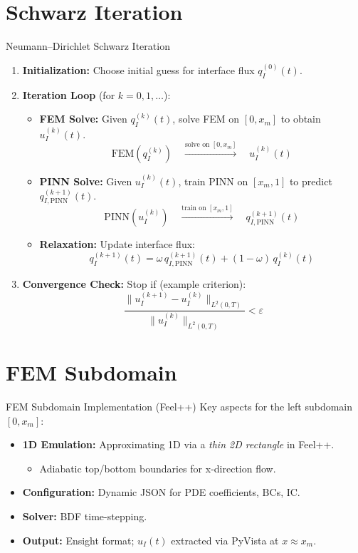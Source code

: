 \documentclass{beamer}
\begin{document}
\section{Schwarz Iteration}
\begin{frame}{Neumann–Dirichlet Schwarz Iteration}
  \begin{enumerate}
    \item \textbf{Initialization:} Choose initial guess for interface flux \(q_I^{(0)}(t)\). 
    \item \textbf{Iteration Loop} (for \(k=0,1,\dots\)):
      \begin{itemize}
        \item[(a)] \textbf{FEM Solve:} Given \(q_I^{(k)}(t)\), solve FEM on \([0,x_m]\) to obtain \(u_I^{(k)}(t)\). 
        \[ \text{FEM}(q_I^{(k)}) \quad \xrightarrow{\text{solve on } [0,x_m]} \quad u_I^{(k)}(t) \] 
        \item[(b)] \textbf{PINN Solve:} Given \(u_I^{(k)}(t)\), train PINN on \([x_m,1]\) to predict \(q_{I,\text{PINN}}^{(k+1)}(t)\). 
        \[ \text{PINN}(u_I^{(k)}) \quad \xrightarrow{\text{train on } [x_m,1]} \quad q_{I,\text{PINN}}^{(k+1)}(t) \] 
        \item[(c)] \textbf{Relaxation:} Update interface flux: 
        \[ q_I^{(k+1)}(t) = \omega \, q_{I,\text{PINN}}^{(k+1)}(t) + (1-\omega) \, q_I^{(k)}(t) \]
      \end{itemize} 
    \item \textbf{Convergence Check:} Stop if (example criterion):
    \[ \frac{\|u_I^{(k+1)}-u_I^{(k)}\|_{L^2(0,T)}}{\|u_I^{(k)}\|_{L^2(0,T)}} < \varepsilon \]
  \end{enumerate}
\end{frame}

\section{FEM Subdomain} 
\begin{frame}{FEM Subdomain Implementation (Feel++)}
  Key aspects for the left subdomain \([0,x_m]\):
  \begin{itemize}
    \item \textbf{1D Emulation:} Approximating 1D via a \textit{thin 2D rectangle} in Feel++.
        \begin{itemize}
            \item Adiabatic top/bottom boundaries for x-direction flow.
        \end{itemize} 
    \item \textbf{Configuration:} Dynamic JSON for PDE coefficients, BCs, IC.
    \item \textbf{Solver:} BDF time-stepping. 
    \item \textbf{Output:} Ensight format; \(u_I(t)\) extracted via PyVista at \(x \approx x_m\).
  \end{itemize}
\end{frame}
\end{document}
